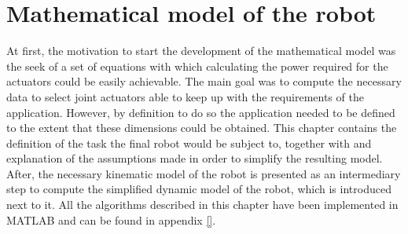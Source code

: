\chapter{Mathematical model of the robot} %
\label{cha:mathematical_model}

At first, the motivation to start the development of the mathematical model was the seek of a set of equations with which calculating the power required for the actuators could be easily achievable.
The main goal was to compute the necessary data to select joint actuators able to keep up with the requirements of the application.
However, by definition to do so the application needed to be defined to the extent that these dimensions could be obtained.
This chapter contains the definition of the task the final robot would be subject to, together with and explanation of the assumptions made in order to simplify the resulting model. 
After, the necessary kinematic model of the robot is presented as an intermediary step to compute the simplified dynamic model of the robot, which is introduced next to it.
All the algorithms described in this chapter have been implemented in MATLAB and can be found in appendix \ref{}.







